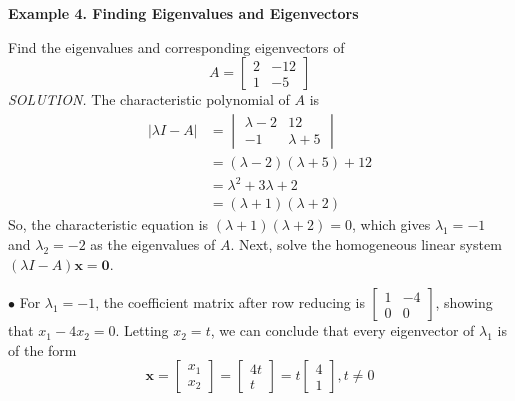 \documentclass{article}
\begin{document}
    \textbf{Example 4. \textcolor{blue5}{Finding Eigenvalues and Eigenvectors}}

    Find the eigenvalues and corresponding eigenvectors of 
    \[A = \begin{bmatrix}
        2 & -12\\
        1 & -5
    \end{bmatrix}\]
    \textit{\textcolor{blue5}{SOLUTION.}} The characteristic polynomial of $A$ is
    \begin{equation*}
        \begin{split}
            | \lambda I - A | &= \begin{vmatrix}
                \lambda - 2 & 12\\
                -1 & \lambda + 5
            \end{vmatrix} \\
                              &= ( \lambda - 2 )( \lambda + 5 ) + 12 \\
                              &= \lambda^2 + 3 \lambda + 2 \\
                              &= ( \lambda + 1 )( \lambda +2 )
        \end{split}
    \end{equation*}
    So, the characteristic equation is $( \lambda + 1 )( \lambda + 2 ) = 0$, which gives $ \lambda_1 = -1$ and $ \lambda_2 = -2$ as the eigenvalues
    of $A$. Next, solve the homogeneous linear system $( \lambda I - A ) \textbf{x} = \textbf{0}$.

    $\bullet$ For $\lambda_1 = -1$, the coefficient matrix after row reducing is $ \begin{bmatrix}
        1 & -4 \\ 0 & 0
    \end{bmatrix}$, showing that $x_1 - 4x_2 = 0$. Letting $x_2 = t$, we can conclude that every eigenvector of $\lambda_1$
    is of the form
    \[ \textbf{x} = \begin{bmatrix}
        x_1 \\ x_2
    \end{bmatrix} = \begin{bmatrix}
        4t \\ t
    \end{bmatrix} = t \begin{bmatrix}
        4 \\ 1
    \end{bmatrix}, t \ne 0\]
\end{document}
